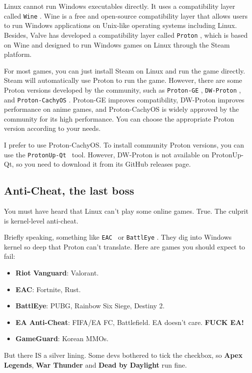 \documentclass[lang=en,color=blue,12pt]{elegantbook}
\let\oldtexttt\texttt
\renewcommand{\texttt}[1]{%
  \begingroup
  \setlength{\fboxsep}{1pt}%
  \colorbox{gray!10}{\oldtexttt{#1}}%
  \endgroup
}
\begin{document}
Linux cannot run Windows executables directly. It uses a compatibility layer
called \texttt{Wine}. Wine is a free and open-source compatibility layer that
allows users to run Windows applications on Unix-like operating systems including
Linux. Besides, Valve has developed a compatibility layer called \texttt{Proton},
which is based on Wine and designed to run Windows games on Linux through the
Steam platform.

For most games, you can just install Steam on Linux and run the game directly.
Steam will automatically use Proton to run the game. However, there are some
Proton versions developed by the community, such as \texttt{Proton-GE},
\texttt{DW-Proton}, and \texttt{Proton-CachyOS}. Proton-GE improves
compatibility, DW-Proton improves performance on anime games,
and Proton-CachyOS is widely approved by the community for its high performance.
You can choose the appropriate Proton version according to your needs.

I prefer to use Proton-CachyOS. To install community Proton versions, you can
use the \texttt{ProtonUp-Qt}\ tool. However, DW-Proton is not available on
ProtonUp-Qt, so you need to download it from its GitHub releases page.

\subsection{\textbf{Anti-Cheat, the last boss}}

You must have heard that Linux can't play some online games.
True. The culprit is kernel-level anti-cheat.

Briefly speaking, something like \texttt{EAC}\ or \texttt{BattlEye}. They
dig into Windows kernel so deep that Proton can't translate.
Here are games you should expect to fail:

\begin{itemize}[itemsep=0pt, parsep=0pt, topsep=0pt, partopsep=0pt]
\item \textbf{Riot Vanguard}: Valorant.
\item \textbf{EAC}: Fortnite, Rust.
\item \textbf{BattlEye}: PUBG, Rainbow Six Siege, Destiny 2.
\item \textbf{EA Anti-Cheat}: FIFA/EA FC, Battlefield. EA
doesn't care. \textbf{FUCK EA!}
\item \textbf{GameGuard}: Korean MMOs.
\end{itemize}

But there IS a silver lining. Some devs bothered to tick the checkbox,
so \textbf{Apex Legends}, \textbf{War Thunder}
and \textbf{Dead by Daylight} run fine.
\end{document}
